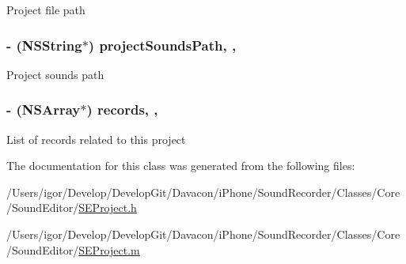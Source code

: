 Project file path \hypertarget{interface_s_e_project_a59726fcb927ff059c83a1ac7b252db0d}{
\subsubsection[{project\-Sounds\-Path}]{\setlength{\rightskip}{0pt plus 5cm}-\/ (N\-S\-String$\ast$) project\-Sounds\-Path\hspace{0.3cm}{\ttfamily [read]}, {\ttfamily [nonatomic]}, {\ttfamily [assign]}}}\label{interface_s_e_project_a59726fcb927ff059c83a1ac7b252db0d}
Project sounds path \hypertarget{interface_s_e_project_ac1f0c37f5832b2ba24ac9bf65f0fdcce}{
\subsubsection[{records}]{\setlength{\rightskip}{0pt plus 5cm}-\/ (N\-S\-Array$\ast$) records\hspace{0.3cm}{\ttfamily [read]}, {\ttfamily [nonatomic]}, {\ttfamily [assign]}}}\label{interface_s_e_project_ac1f0c37f5832b2ba24ac9bf65f0fdcce}
List of records related to this project 

The documentation for this class was generated from the following files\-:\begin{DoxyCompactItemize}
\item 
/\-Users/igor/\-Develop/\-Develop\-Git/\-Davacon/i\-Phone/\-Sound\-Recorder/\-Classes/\-Core/\-Sound\-Editor/\hyperlink{_s_e_project_8h}{S\-E\-Project.\-h}\item 
/\-Users/igor/\-Develop/\-Develop\-Git/\-Davacon/i\-Phone/\-Sound\-Recorder/\-Classes/\-Core/\-Sound\-Editor/\hyperlink{_s_e_project_8m}{S\-E\-Project.\-m}\end{DoxyCompactItemize}
